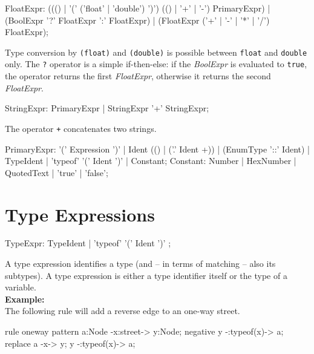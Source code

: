 \begin{rail}  
  FloatExpr: ((() | '(' ('float' | 'double') ')') (() | '+' | '-') PrimaryExpr) | (BoolExpr '?' FloatExpr ':' FloatExpr) | (FloatExpr ('+' | '-' | '*' | '/') FloatExpr);
\end{rail} 
Type conversion by \texttt{(float)} and \texttt{(double)} is possible between \texttt{float} and \texttt{double} only. The \texttt{?} operator is a simple if-then-else: if the \emph{BoolExpr} is evaluated to \texttt{true}, the operator returns the first \emph{FloatExpr}, otherwise it returns the second \emph{FloatExpr}.

\begin{rail}
  StringExpr: PrimaryExpr | StringExpr '+' StringExpr;
\end{rail}
The operator \texttt{+} concatenates two strings.

\begin{rail} 
  PrimaryExpr: '(' Expression ')' | Ident (() | ('.' Ident +)) | (EnumType '::' Ident) | TypeIdent | 'typeof' '(' Ident ')' | Constant;
  Constant: Number | HexNumber | QuotedText | 'true' | 'false';
\end{rail}

\section{Type Expressions}
\label{typeexpressions}

\begin{rail}
  TypeExpr: TypeIdent | 'typeof' '(' Ident ')' ;
\end{rail}
A type expression identifies a type (and -- in terms of matching -- also its subtypes). A type expression is either a type identifier itself or the type of a variable.\\
{\small \textbf{Example:}\\
The following rule will add a reverse edge to an one-way street.}
\begin{grgen}
rule oneway {
    pattern{
        a:Node -x:street-> y:Node;
        negative{
            y -:typeof(x)-> a;
        }
    } 
    replace{
      a -x-> y;
      y -:typeof(x)-> a;
    }
}
\end{grgen}

